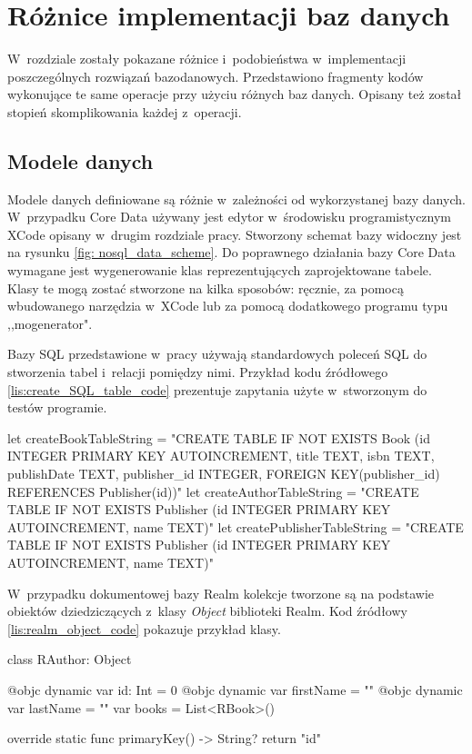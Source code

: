 \section{Różnice implementacji baz danych}

 W~rozdziale zostały pokazane różnice i~podobieństwa w~implementacji poszczególnych rozwiązań bazodanowych. Przedstawiono fragmenty kodów wykonujące te same operacje przy użyciu różnych baz danych. Opisany też został stopień skomplikowania każdej z~operacji. 

\subsection{Modele danych}
Modele danych definiowane są różnie w~zależności od wykorzystanej bazy danych. W~przypadku Core Data używany jest edytor w~środowisku programistycznym XCode opisany w~drugim rozdziale pracy. Stworzony schemat bazy widoczny jest na rysunku \ref{fig: nosql_data_scheme}. Do poprawnego działania bazy Core Data wymagane jest wygenerowanie klas reprezentujących zaprojektowane tabele. Klasy te mogą zostać stworzone na kilka sposobów: ręcznie, za pomocą wbudowanego narzędzia w~XCode lub za pomocą dodatkowego programu typu ,,mogenerator". 

Bazy SQL przedstawione w~pracy używają standardowych poleceń SQL do stworzenia tabel i~relacji pomiędzy nimi. Przykład kodu źródłowego \ref{lis:create_SQL_table_code} prezentuje zapytania użyte w~stworzonym do testów  programie. 

\begin{code}[
		language=swift,
		caption={Polecenia tworzenia tabel w~SQLite i~FMDB},
		label={lis:create_SQL_table_code},
	]
    let createBookTableString = "CREATE TABLE IF NOT EXISTS Book (id INTEGER PRIMARY KEY AUTOINCREMENT, title TEXT, isbn TEXT, publishDate TEXT, publisher_id INTEGER, FOREIGN KEY(publisher_id) REFERENCES Publisher(id))"
    let createAuthorTableString = "CREATE TABLE IF NOT EXISTS Publisher (id INTEGER PRIMARY KEY AUTOINCREMENT, name TEXT)"
    let createPublisherTableString = "CREATE TABLE IF NOT EXISTS Publisher (id INTEGER PRIMARY KEY AUTOINCREMENT, name TEXT)"
\end{code}

 W~przypadku dokumentowej bazy Realm kolekcje tworzone są na podstawie obiektów dziedziczących z~klasy \textit{Object} biblioteki Realm. Kod źródłowy \ref{lis:realm_object_code} pokazuje przykład klasy.

\begin{code}[
		language=swift,
		caption={Przykład obiektu bazy Realm},
		label={lis:realm_object_code},
	]
class RAuthor: Object {
    
    @objc dynamic var id: Int = 0
    @objc dynamic var firstName = ""
    @objc dynamic var lastName = ""    
    var books = List<RBook>()
    
    override static func primaryKey() -> String? {
        return "id"
    }
}
\end{code}

